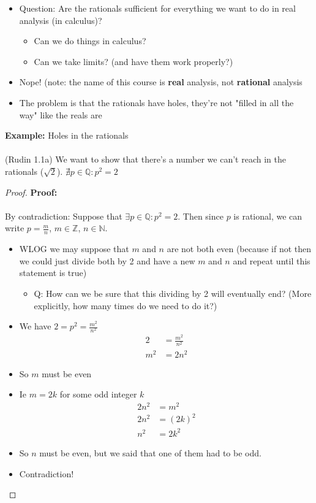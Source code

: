 \documentclass{article}
\newcommand{\Z}{\mathbb{Z}}
\newcommand{\Q}{\mathbb{Q}}
\newcommand{\N}{\mathbb{N}}
\begin{document}
\begin{itemize}
\begin{itemize}
		\item Question: Are the rationals sufficient for everything we want to do in real analysis (in calculus)?
		\begin{itemize}
			\item Can we do things in calculus? 
			\item Can we take limits? (and have them work properly?)
		\end{itemize}
		\item Nope! (note: the name of this course is \textbf{real} analysis, not \textbf{rational} analysis
		\item The problem is that the rationals have holes, they're not "filled in all the way" like the reals are
	\end{itemize}
\end{itemize}
\begin{example} 
		\textbf{Example:} Holes in the rationals \\
		~\\
		(Rudin 1.1a)  We want to show that there's a number we can't reach in the rationals ($\sqrt{2}$). $\nexists p\in\Q : p^2=2$  
		\begin{proof} 
		\textbf{Proof:} \\
		~\\
		By contradiction: Suppose that $\exists p\in\Q : p^2=2$. Then since $p$ is rational, we can write $p = \frac{m}{n}$, $m\in\Z$, $n\in\N$.
		\begin{itemize}
			\item WLOG we may suppose that $m$ and $n$ are not both even (because if not then we could just divide both by 2 and have a new $m$ and $n$ and repeat until this statement is true)
			\begin{itemize}
				\item Q: How can we be sure that this dividing by 2 will eventually end? (More explicitly, how many times do we need to do it?)
			\end{itemize}
			\item We have $2 = p^2 = \frac{m^2}{n^2}$
			\begin{align}
				2 &= \frac{m^2}{n^2} \\
				m^2 &= 2n^2
			\end{align}
		\item So $m$ must be even
		\item Ie $m = 2k$ for some odd integer $k$
		\begin{align}
			2n^2 &= m^2 \\
			2n^2 &= (2k)^2 \\
			n^2 &= 2k^2 
		\end{align}
		\item So $n$ must be even, but we said that one of them had to be odd.
		\item Contradiction!
		\end{itemize}
		\end{proof}
	\end{example}
\end{document}
